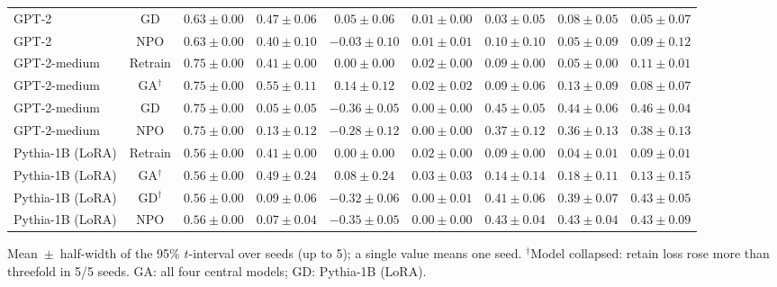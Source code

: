 {\begin{longtable}{@{\extracolsep{\fill}}lcccccccc@{}}
GPT-2 & GD & $0.63 \pm 0.00$ & $0.47 \pm 0.06$ & $0.05 \pm 0.06$ & $0.01 \pm 0.00$ & $0.03 \pm 0.05$ & $0.08 \pm 0.05$ & $0.05 \pm 0.07$ \\
GPT-2 & NPO & $0.63 \pm 0.00$ & $0.40 \pm 0.10$ & $-0.03 \pm 0.10$ & $0.01 \pm 0.01$ & $0.10 \pm 0.10$ & $0.05 \pm 0.09$ & $0.09 \pm 0.12$ \\
GPT-2-medium & Retrain & $0.75 \pm 0.00$ & $0.41 \pm 0.00$ & $0.00 \pm 0.00$ & $0.02 \pm 0.00$ & $0.09 \pm 0.00$ & $0.05 \pm 0.00$ & $0.11 \pm 0.01$ \\
GPT-2-medium & GA$^{\dagger}$ & $0.75 \pm 0.00$ & $0.55 \pm 0.11$ & $0.14 \pm 0.12$ & $0.02 \pm 0.02$ & $0.09 \pm 0.06$ & $0.13 \pm 0.09$ & $0.08 \pm 0.07$ \\
GPT-2-medium & GD & $0.75 \pm 0.00$ & $0.05 \pm 0.05$ & $-0.36 \pm 0.05$ & $0.00 \pm 0.00$ & $0.45 \pm 0.05$ & $0.44 \pm 0.06$ & $0.46 \pm 0.04$ \\
GPT-2-medium & NPO & $0.75 \pm 0.00$ & $0.13 \pm 0.12$ & $-0.28 \pm 0.12$ & $0.00 \pm 0.00$ & $0.37 \pm 0.12$ & $0.36 \pm 0.13$ & $0.38 \pm 0.13$ \\
Pythia-1B (LoRA) & Retrain & $0.56 \pm 0.00$ & $0.41 \pm 0.00$ & $0.00 \pm 0.00$ & $0.02 \pm 0.00$ & $0.09 \pm 0.00$ & $0.04 \pm 0.01$ & $0.09 \pm 0.01$ \\
Pythia-1B (LoRA) & GA$^{\dagger}$ & $0.56 \pm 0.00$ & $0.49 \pm 0.24$ & $0.08 \pm 0.24$ & $0.03 \pm 0.03$ & $0.14 \pm 0.14$ & $0.18 \pm 0.11$ & $0.13 \pm 0.15$ \\
Pythia-1B (LoRA) & GD$^{\dagger}$ & $0.56 \pm 0.00$ & $0.09 \pm 0.06$ & $-0.32 \pm 0.06$ & $0.00 \pm 0.01$ & $0.41 \pm 0.06$ & $0.39 \pm 0.07$ & $0.43 \pm 0.05$ \\
Pythia-1B (LoRA) & NPO & $0.56 \pm 0.00$ & $0.07 \pm 0.04$ & $-0.35 \pm 0.05$ & $0.00 \pm 0.00$ & $0.43 \pm 0.04$ & $0.43 \pm 0.04$ & $0.43 \pm 0.09$ \\
\end{longtable}
Mean~$\pm$~half-width of the 95\% $t$-interval over seeds (up to 5); a single value means one seed. $^{\dagger}$Model collapsed: retain loss rose more than threefold in 5/5 seeds. GA: all four central models; GD: Pythia-1B (LoRA).\par
}
